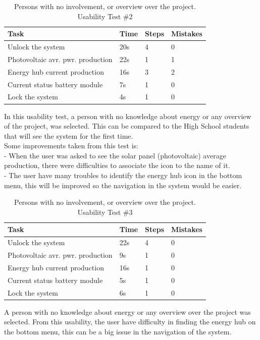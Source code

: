 \begin{table}[H]
	\begin{tabular}{ | l | l | l | l |}
		\hline
		Task 					     & 		Time 	& 	Steps 	&	 Mistakes \\ \hline
		Unlock the system 			     & 		20s 		&	 4 		& 		0 	\\ \hline
		Photovoltaic avr. pwr. production  & 		22s 		& 	 1 		& 		1 	\\ \hline
		Energy hub current production 	     & 		16s 		& 	 3 		& 		2 	\\ \hline
		Current status battery module 	     & 		7s 		& 	 1 		& 		0 	\\ \hline
		Lock the system 			     & 		4s 		& 	 1 		& 		0 	\\ \hline
	\end{tabular}
     \caption{Persons with no involvement, or overview over the project. Usability Test \#2}
\end{table}
In this usability test, a person with no knowledge about energy or any overview of the project, was selected. This can be compared to the High School students that will see the system for the first time.\\
Some improvements taken from this test is:\\
- When the user was asked to see the solar panel (photovoltaic) average production, there were difficulties to associate the icon to the name of it.\\
- The user have many troubles to identify the energy hub icon in the bottom menu, this will be improved so the navigation in the system would be easier.\\

\begin{table}[H]
	\begin{tabular}{ | l | l | l | l |}
		\hline
		Task 					      & 	Time 	& 	Steps 	& 	Mistakes  \\ \hline
		Unlock the system 			      & 	22s 		& 	4 		& 	0 		\\ \hline
		Photovoltaic avr. pwr. production   & 	9s 		& 	1 		& 	0 		\\ \hline
		Energy hub current production 	      & 	16s 		& 	1 		& 	0 		\\ \hline
		Current status battery module 	      & 	5s 		& 	1 		& 	0 		\\ \hline
		Lock the system 			      & 	6s 		& 	1 		& 	0		\\ \hline
	\end{tabular}
    \caption{Persons with no involvement, or overview over the project. Usability Test \#3}
\end{table}
A person with no knowledge about energy or any overview over the project was selected. From this usability, the user have difficulty in finding the energy hub on the bottom menu, this can be a big issue in the navigation of the system. 

